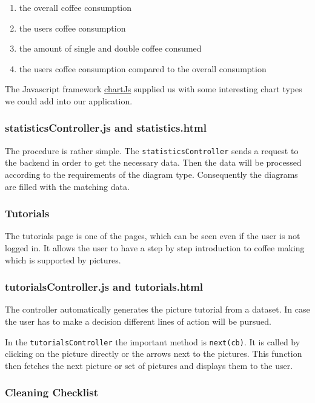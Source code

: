 \begin{enumerate}
\def\labelenumi{\arabic{enumi}.}
\item
  the overall coffee consumption
\item
  the users coffee consumption
\item
  the amount of single and double coffee consumed
\item
  the users coffee consumption compared to the overall consumption
\end{enumerate}

The Javascript framework \href{chartjs.org/docs/}{chartJs} supplied us
with some interesting chart types we could add into our application.

\subsubsection*{statisticsController.js and statistics.html}

The procedure is rather simple. The \texttt{statisticsController} sends
a request to the backend in order to get the necessary data. Then the
data will be processed according to the requirements of the diagram
type. Consequently the diagrams are filled with the matching data.

\subsubsection{Tutorials}\label{tutorials}

The tutorials page is one of the pages, which can be seen even if the
user is not logged in. It allows the user to have a step by step
introduction to coffee making which is supported by pictures.

\subsubsection*{tutorialsController.js and tutorials.html}

The controller automatically generates the picture tutorial from a
dataset. In case the user has to make a decision different lines of
action will be pursued.

In the \texttt{tutorialsController} the important method is
\texttt{next(cb)}. It is called by clicking on the picture directly or
the arrows next to the pictures. This function then fetches the next
picture or set of pictures and displays them to the user.

\subsubsection{Cleaning Checklist}\label{cleaning-checklist}

